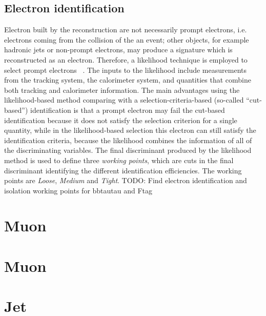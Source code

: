 \subsection{Electron identification}
Electron built by the reconstruction are not necessarily prompt electrons,
i.e. electrons coming from the collision of the an event; other objects, 
for example hadronic jets or non-prompt electrons,
may produce a signature which is reconstructed as an electron. 
Therefore, a likelihood technique is employed to select prompt electrons ~\cite{PERF-2017-01}.
The inputs to the likelihood include measurements from the tracking system, the
calorimeter system, and quantities that combine both tracking and calorimeter information.
The main advantages using the likelihood-based method comparing with 
a selection-criteria-based (so-called ``cut-based'') identification is that
a prompt electron may fail the cut-based identification because it
does not satisfy the selection criterion for a single quantity, 
while in the likelihood-based selection this electron can
still satisfy the identification criteria, 
because the likelihood combines the information of all of the discriminating variables.
The final discriminant produced by the likelihood method is used to define 
three \textit{working points}, which are cuts in the final discriminant 
identifying the different identification efficiencies. The working points are
\textit{Loose}, \textit{Medium} and \textit{Tight}. 
TODO: Find electron identification and isolation working points for bbtautau and Ftag

\section{Muon}



\section{Muon}
\section{Jet}
